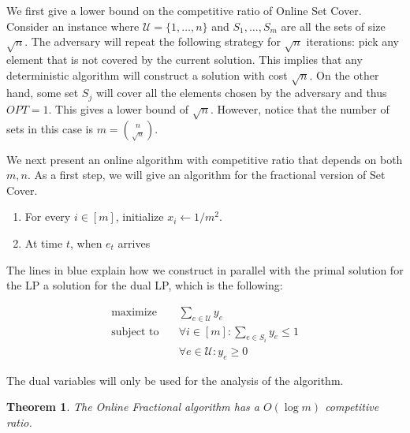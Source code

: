 \documentclass[10pt,a4paper]{article}
\newtheorem{thm}{Theorem}[section]
\newcommand{\mU}{\mathcal{U}}
\begin{document}
We first give a lower bound on the competitive ratio of Online Set Cover. Consider an instance where $\mU = \{1, \dots, n \}$ and $S_1, \dots, S_m$ are all the sets of size $\sqrt{n}$. The adversary will repeat the following strategy for $\sqrt{n}$ iterations: pick any element that is not covered by the current solution. This implies that any deterministic algorithm will construct a solution with cost $\sqrt{n}$. On the other hand, some set $S_j$ will cover all the elements chosen by the adversary and thus $OPT = 1$. This gives a lower bound of $\sqrt{n}$. However, notice that the number of sets in this case is $m = \binom{n}{\sqrt{n}}$.

We next present an online algorithm with competitive ratio that depends on both $m,n$. As a first step, we will give an algorithm for the fractional version of Set Cover. 

\begin{enumerate}
\item For every $i \in [m]$, initialize $x_i \leftarrow 1/m^2$.
\item At time $t$, when $e_t$ arrives
\end{enumerate}

The lines in blue explain how we construct in parallel with the primal solution for the LP a solution for the dual LP, which is the following:

\begin{align*}
\text{maximize} \quad &  \sum_{e \in \mU} y_e \\
\text{subject to} \quad & \forall i \in [m] : \sum_{e \in S_i} y_e \leq 1 \\
& \forall e \in \mU: y_e \geq 0
\end{align*}

The dual variables will only be used for the analysis of the algorithm. 

\begin{thm}
The Online Fractional algorithm has a $O(\log m)$ competitive ratio.
\end{thm}
\end{document}
